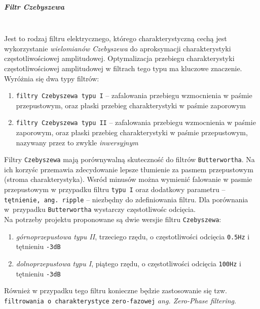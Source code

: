 \documentclass[a4paper, 11pt]{article}
\begin{document}
\subparagraph{Filtr Czebyszewa} 
\mbox{} \\
Jest to rodzaj filtru elektrycznego, którego charakterystyczną cechą jest wykorzystanie \textit{wielomianów Czebyszewa} do aproksymacji charakterystyki częstotliwościowej amplitudowej. Optymalizacja przebiegu charakterystyki częstotliwościowej amplitudowej w filtrach tego typu ma kluczowe znaczenie.\\
Wyróżnia się dwa typy filtrów:
\begin{enumerate}
\item \verb|filtry Czebyszewa typu I| -- zafalowania przebiegu wzmocnienia w paśmie przepustowym, oraz płaski przebieg charakterystyki w paśmie zaporowym
\item \verb|filtry Czebyszewa typu II| -- zafalowania przebiegu wzmocnienia w paśmie zaporowym, oraz płaski przebieg charakterystyki w paśmie przepustowym, nazywany przez to zwykle \textit{inwersyjnym}
\end{enumerate}
Filtry \verb|Czebyszewa| mają porównywalną skuteczność do filtrów \verb|Butterwortha|. Na ich korzyśc przemawia zdecydowanie lepsze tłumienie za pasmem przepustowym (stroma charakterystyka). Wsród minusów można wymienić falowanie w pasmie przepustowym w przypadku filtru \verb|typu I| oraz dodatkowy parametru -- \verb|tętnienie, ang. ripple| -- niezbędny do zdefiniowania filtru. Dla porównania w~przypadku \verb|Butterwortha| wystarczy częstotliwośc odcięcia.\\
Na potrzeby projektu proponowane są dwie wersjie filtru \verb|Czebyszewa|:
\begin{enumerate}
\item \textit{górnoprzepustowa typu II}, trzeciego rzędu, o częstotliwości odcięcia \verb|0.5Hz| i tętnieniu \verb|-3dB|
\item \textit{dolnoprzepustowa typu I}, piątego rzędu, o częstotliwości odcięcia \verb|100Hz| i tętnieniu \verb|-3dB|
\end{enumerate}
Również w przypadku tego filtru konieczne będzie zastosowanie się tzw. \verb|filtrowania o charakterystyce| \verb|zero-fazowej| \textit{ang. Zero-Phase filtering}.
\end{document}
